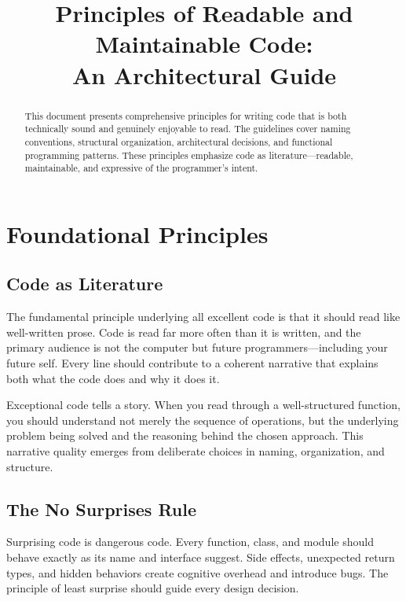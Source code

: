 \documentclass[11pt,a4paper]{article}
\title{Principles of Readable and Maintainable Code:\\An Architectural Guide}
\author{}
\date{}
\begin{document}
\maketitle

\begin{abstract}
This document presents comprehensive principles for writing code that is both technically sound and genuinely enjoyable to read. The guidelines cover naming conventions, structural organization, architectural decisions, and functional programming patterns. These principles emphasize code as literature---readable, maintainable, and expressive of the programmer's intent.
\end{abstract}

\tableofcontents

\section{Foundational Principles}

\subsection{Code as Literature}

The fundamental principle underlying all excellent code is that it should read like well-written prose. Code is read far more often than it is written, and the primary audience is not the computer but future programmers---including your future self. Every line should contribute to a coherent narrative that explains both what the code does and why it does it.

Exceptional code tells a story. When you read through a well-structured function, you should understand not merely the sequence of operations, but the underlying problem being solved and the reasoning behind the chosen approach. This narrative quality emerges from deliberate choices in naming, organization, and structure.

\subsection{The No Surprises Rule}

Surprising code is dangerous code. Every function, class, and module should behave exactly as its name and interface suggest. Side effects, unexpected return types, and hidden behaviors create cognitive overhead and introduce bugs. The principle of least surprise should guide every design decision.
\end{document}
